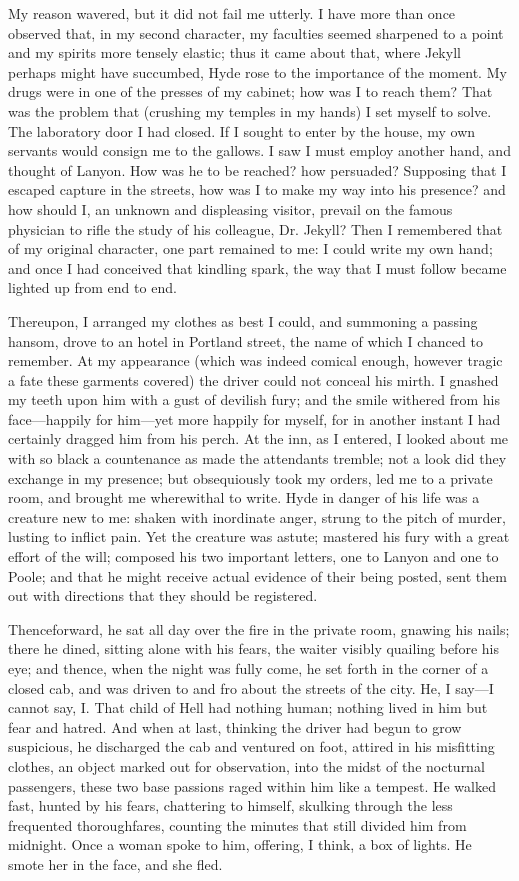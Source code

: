 \documentclass[]{novel}
\begin{document}
My reason wavered, but it did not fail me utterly. I have more than once observed that, in my second character, my faculties seemed sharpened to a point and my spirits more tensely elastic; thus it came about that, where Jekyll perhaps might have succumbed, Hyde rose to the importance of the moment. My drugs were in one of the presses of my cabinet; how was I to reach them? That was the problem that (crushing my temples in my hands) I set myself to solve. The laboratory door I had closed. If I sought to enter by the house, my own servants would consign me to the gallows. I saw I must employ another hand, and thought of Lanyon. How was he to be reached? how persuaded? Supposing that I escaped capture in the streets, how was I to make my way into his presence? and how should I, an unknown and displeasing visitor, prevail on the famous physician to rifle the study of his colleague, Dr. Jekyll? Then I remembered that of my original character, one part remained to me: I could write my own hand; and once I had conceived that kindling spark, the way that I must follow became lighted up from end to end.

Thereupon, I arranged my clothes as best I could, and summoning a passing hansom, drove to an hotel in Portland street, the name of which I chanced to remember. At my appearance (which was indeed comical enough, however tragic a fate these garments covered) the driver could not conceal his mirth. I gnashed my teeth upon him with a gust of devilish fury; and the smile withered from his face—happily for him—yet more happily for myself, for in another instant I had certainly dragged him from his perch. At the inn, as I entered, I looked about me with so black a countenance as made the attendants tremble; not a look did they exchange in my presence; but obsequiously took my orders, led me to a private room, and brought me wherewithal to write. Hyde in danger of his life was a creature new to me: shaken with inordinate anger, strung to the pitch of murder, lusting to inflict pain. Yet the creature was astute; mastered his fury with a great effort of the will; composed his two important letters, one to Lanyon and one to Poole; and that he might receive actual evidence of their being posted, sent them out with directions that they should be registered.

Thenceforward, he sat all day over the fire in the private room, gnawing his nails; there he dined, sitting alone with his fears, the waiter visibly quailing before his eye; and thence, when the night was fully come, he set forth in the corner of a closed cab, and was driven to and fro about the streets of the city. He, I say—I cannot say, I. That child of Hell had nothing human; nothing lived in him but fear and hatred. And when at last, thinking the driver had begun to grow suspicious, he discharged the cab and ventured on foot, attired in his misfitting clothes, an object marked out for observation, into the midst of the nocturnal passengers, these two base passions raged within him like a tempest. He walked fast, hunted by his fears, chattering to himself, skulking through the less frequented thoroughfares, counting the minutes that still divided him from midnight. Once a woman spoke to him, offering, I think, a box of lights. He smote her in the face, and she fled.
\end{document}
